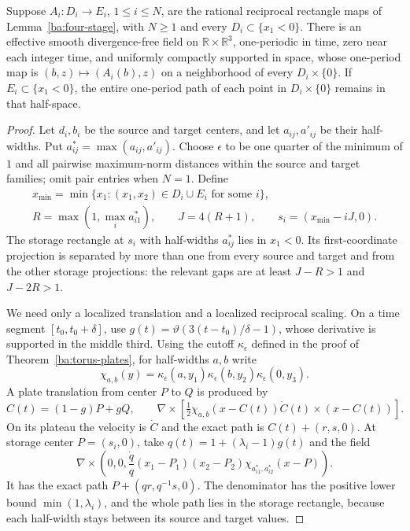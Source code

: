 \begin{lemma}\label{ba:parking}
Suppose $A_i:D_i\to E_i$, $1\le i\le N$, are the rational reciprocal
rectangle maps of Lemma~\ref{ba:four-stage}, with $N\ge1$ and every
$D_i\subset\{x_1<0\}$.  There is an effective smooth divergence-free
field on $\mathbb R\times\mathbb R^3$, one-periodic in time, zero near
each integer time, and uniformly compactly supported in space, whose
one-period map is $(b,z)\mapsto(A_i(b),z)$ on a neighborhood of every
$D_i\times\{0\}$.  If $E_i\subset\{x_1<0\}$, the entire
one-period path of each point in $D_i\times\{0\}$ remains in that
half-space.
\end{lemma}

\begin{proof}\label{ba:parking-proof}
Let $d_i,b_i$ be the source and target centers, and let $a_{ij},a'_{ij}$
be their half-widths.  Put $a^*_{ij}=\max(a_{ij},a'_{ij})$.
Choose $\epsilon$ to be one quarter of the minimum of $1$ and all
pairwise maximum-norm distances within the source and target families;
omit pair entries when $N=1$.  Define
\[
 \begin{gathered}
 x_{\min}=\min\{x_1:(x_1,x_2)\in D_i\cup E_i\text{ for some }i\},\\
 R=\max(1,\max_i a^*_{i1}),\qquad J=4(R+1),\qquad
 s_i=(x_{\min}-iJ,0).
 \end{gathered}
\]
The storage rectangle at $s_i$ with half-widths $a^*_{ij}$ lies in
$x_1<0$.  Its first-coordinate projection is separated by more than one
from every source and target and from the other storage projections:
the relevant gaps are at least $J-R>1$ and $J-2R>1$.

We need only a localized translation and a localized reciprocal scaling.
On a time segment $[t_0,t_0+\delta]$, use
$g(t)=\vartheta(3(t-t_0)/\delta-1)$, whose derivative is supported
in the middle third.  Using the cutoff $\kappa_\epsilon$ defined in
the proof of Theorem~\ref{ba:torus-plates}, for half-widths $a,b$ write
\[
 \chi_{a,b}(y)=\kappa_\epsilon(a,y_1)
               \kappa_\epsilon(b,y_2)\kappa_\epsilon(0,y_3).
\]
A plate translation from center $P$ to $Q$ is produced by
\[
 C(t)=(1-g)P+gQ,\qquad
 \nabla\times\left[
 \tfrac12\chi_{a,b}(x-C(t))\dot C(t)\times(x-C(t))\right].
\]
On its plateau the velocity is $\dot C$ and the exact path is
$C(t)+(r,s,0)$.  At storage center $P=(s_i,0)$, take
$q(t)=1+(\lambda_i-1)g(t)$ and the field
\[
 \nabla\times\left(0,0,
 \frac{\dot q}{q}(x_1-P_1)(x_2-P_2)
                           \chi_{a^*_{i1},a^*_{i2}}(x-P)\right).
\]
It has the exact path $P+(qr,q^{-1}s,0)$.  The denominator has the
positive lower bound $\min(1,\lambda_i)$, and the whole path lies in
the storage rectangle, because each half-width stays between its source
and target values.


\end{proof}
